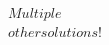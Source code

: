 \documentclass[preview]{standalone}
\begin{document}
\begin{align*}
Multiple\\other solutions!
\end{align*}
\end{document}
